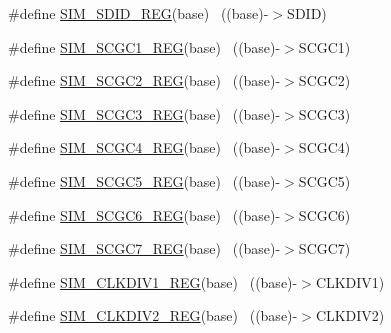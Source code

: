 \begin{DoxyCompactItemize}
\item 
\#define \hyperlink{group___s_i_m___register___accessor___macros_gad1b6e604a7db5ffcbe8c3e16d85c8e6b}{S\+I\+M\+\_\+\+S\+D\+I\+D\+\_\+\+R\+EG}(base)                                          ~((base)-\/$>$S\+D\+ID)
\item 
\#define \hyperlink{group___s_i_m___register___accessor___macros_ga5d7eb6d5c186d9fd66456b543145d886}{S\+I\+M\+\_\+\+S\+C\+G\+C1\+\_\+\+R\+EG}(base)                                        ~((base)-\/$>$S\+C\+G\+C1)
\item 
\#define \hyperlink{group___s_i_m___register___accessor___macros_gae8d94cd7e3f87001db2cef56ef232ab3}{S\+I\+M\+\_\+\+S\+C\+G\+C2\+\_\+\+R\+EG}(base)                                        ~((base)-\/$>$S\+C\+G\+C2)
\item 
\#define \hyperlink{group___s_i_m___register___accessor___macros_ga4aa72db302e92ef6729659169881dc61}{S\+I\+M\+\_\+\+S\+C\+G\+C3\+\_\+\+R\+EG}(base)                                        ~((base)-\/$>$S\+C\+G\+C3)
\item 
\#define \hyperlink{group___s_i_m___register___accessor___macros_gab863740854e0a595d5d450e533ded630}{S\+I\+M\+\_\+\+S\+C\+G\+C4\+\_\+\+R\+EG}(base)                                        ~((base)-\/$>$S\+C\+G\+C4)
\item 
\#define \hyperlink{group___s_i_m___register___accessor___macros_gaf51026d4b580eca5948ae938148192e9}{S\+I\+M\+\_\+\+S\+C\+G\+C5\+\_\+\+R\+EG}(base)                                        ~((base)-\/$>$S\+C\+G\+C5)
\item 
\#define \hyperlink{group___s_i_m___register___accessor___macros_ga0d700471b59fa17a37db41eea9ac34d4}{S\+I\+M\+\_\+\+S\+C\+G\+C6\+\_\+\+R\+EG}(base)                                        ~((base)-\/$>$S\+C\+G\+C6)
\item 
\#define \hyperlink{group___s_i_m___register___accessor___macros_ga8524b7aa144aa516fbbc9ac2da38c7b0}{S\+I\+M\+\_\+\+S\+C\+G\+C7\+\_\+\+R\+EG}(base)                                        ~((base)-\/$>$S\+C\+G\+C7)
\item 
\#define \hyperlink{group___s_i_m___register___accessor___macros_ga9a2e39cdabbfa7d094a5442016be4dd0}{S\+I\+M\+\_\+\+C\+L\+K\+D\+I\+V1\+\_\+\+R\+EG}(base)                                    ~((base)-\/$>$C\+L\+K\+D\+I\+V1)
\item 
\#define \hyperlink{group___s_i_m___register___accessor___macros_gaddf08644ec398256d25e6106daad245b}{S\+I\+M\+\_\+\+C\+L\+K\+D\+I\+V2\+\_\+\+R\+EG}(base)                                    ~((base)-\/$>$C\+L\+K\+D\+I\+V2)

\end{DoxyCompactItemize}
